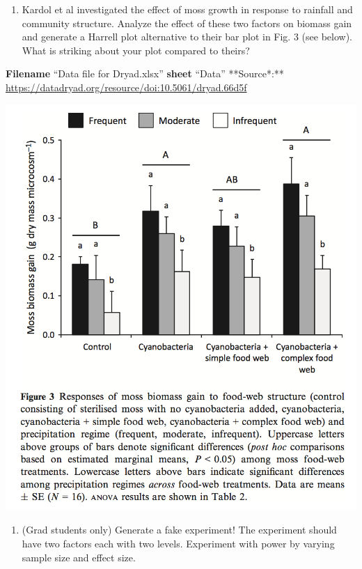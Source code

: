 \documentclass[]{book}
\providecommand{\tightlist}{%
  \setlength{\itemsep}{0pt}\setlength{\parskip}{0pt}}
\begin{document}
\begin{enumerate}
\def\labelenumi{\arabic{enumi}.}
\setcounter{enumi}{2}
\tightlist
\item
  Kardol et al investigated the effect of moss growth in response to
  rainfall and community structure. Analyze the effect of these two
  factors on biomass gain and generate a Harrell plot alternative to
  their bar plot in Fig. 3 (see below). What is striking about your plot
  compared to theirs?
\end{enumerate}

\textbf{Filename} ``Data file for Dryad.xlsx'' \textbf{sheet} ``Data''
**Source*:**
\url{https://datadryad.org/resource/doi:10.5061/dryad.66d5f}

\includegraphics{images/kardol_fig_3.png}

\begin{enumerate}
\def\labelenumi{\arabic{enumi}.}
\setcounter{enumi}{3}
\tightlist
\item
  (Grad students only) Generate a fake experiment! The experiment should
  have two factors each with two levels. Experiment with power by
  varying sample size and effect size.
\end{enumerate}
\end{document}

